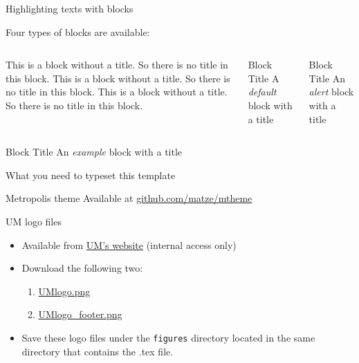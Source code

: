 \documentclass[12pt]{beamer}
\begin{document}
\begin{frame}{{\color{UMYellow} Highlighting} texts with blocks}

Four types of blocks are available:
\bigskip

\begin{columns}
		\begin{block}{}
		This is a block without a title. So there is no title in this block. This is a block without a title. So there is no title in this block. This is a block without a title. So there is no title in this block. 

		\end{block}
		\begin{block}{Block Title}
		A \emph{default} block with a title
		\end{block}

		\begin{alertblock}{Block Title}
		An \emph{alert} block with a title
		\end{alertblock}

\end{columns} 
		\begin{exampleblock}{Block Title}
		An \emph{example} block with a title
		\end{exampleblock}
\end{frame}


\begin{frame}{{\color{UMYellow} What you need} to typeset this template}

\begin{exampleblock}{Metropolis theme}
Available at {\footnotesize \href{https://github.com/matze/mtheme}{github.com/matze/mtheme}}	
\end{exampleblock}

\begin{exampleblock}{UM logo files}
\begin{itemize}
\item Available from \href{linktoUM}{UM's website} (internal access only)
\item Download the following two: 
	\begin{enumerate}
	\item \href{linktoUM}{\footnotesize {UMlogo.png}}
	\item \href{linktoUM}{\footnotesize {UMlogo\_footer.png}}
	\end{enumerate}
\item Save these logo files under the {\tt \footnotesize figures} directory located in the same directory that contains the .tex file.
\end{itemize}
\end{exampleblock}

\end{frame}
\end{document}
